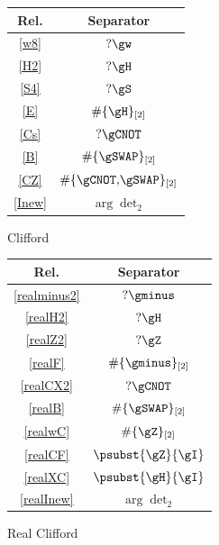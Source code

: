 \documentclass[10pt,a4paper]{article}
\begin{document}
\begin{figure}[ht]
  \centering
  \begin{subfigure}[t]{0.31\textwidth}
    \centering
    \caption{Clifford}
    \begin{tabular}{|c|c|}
      \hline
      \textbf{Rel.} & \textbf{Separator} \\
      \hline
      \eqref{w8}   & \(?\gw\)   \\
      \eqref{H2}   & \(?\gH\)   \\
      \eqref{S4}   & \(?\gS\)   \\
      \eqref{E}    & \(\#\{\gH\}_{[2]}\) \\
      \eqref{Cs}   & \(?\gCNOT\)\\
      \eqref{B}    & \(\#\{\gSWAP\}_{[2]}\) \\
      \eqref{CZ}   & \(\#\{\gCNOT,\!\gSWAP\}_{[2]}\) \\
      \eqref{Inew} & \(\arg\det_{2}\) \\
      \hline
    \end{tabular}
  \end{subfigure}
  \begin{subfigure}[t]{0.31\textwidth}
    \centering
    \caption{Real Clifford}
    \begin{tabular}{|c|c|}
      \hline
      \textbf{Rel.}      & \textbf{Separator} \\
      \hline
      \eqref{realminus2}     & \(?\gminus\) \\
      \eqref{realH2}         & \(?\gH\) \\
      \eqref{realZ2}         & \(?\gZ\) \\
      \eqref{realF}          & \(\#\{\gminus\}_{[2]}\) \\
      \eqref{realCX2}        & \(?\gCNOT\) \\
      \eqref{realB}          & \(\#\{\gSWAP\}_{[2]}\) \\
      \eqref{realwC}         & \(\#\{\gZ\}_{[2]}\) \\
      \eqref{realCF}         & \(\psubst{\gZ}{\gI}\) \\
      \eqref{realXC}         & \(\psubst{\gH}{\gI}\) \\
      \eqref{realInew}       & \(\arg\det_{2}\) \\
      \hline
    \end{tabular}
  \end{subfigure}
  \begin{subfigure}[t]{0.31\textwidth}

\end{subfigure}
\end{figure}
\end{document}
